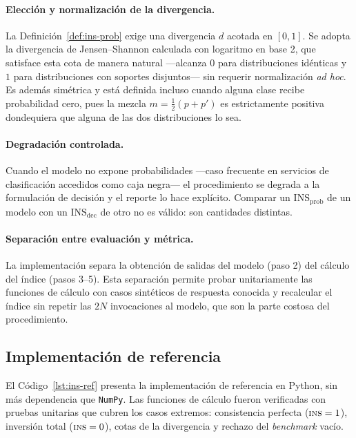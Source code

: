 \paragraph{Elección y normalización de la divergencia.} La
Definición~\ref{def:ins-prob} exige una divergencia $d$ acotada en $[0,1]$.
Se adopta la divergencia de Jensen--Shannon calculada con logaritmo en base 2,
que satisface esta cota de manera natural ---alcanza $0$ para distribuciones
idénticas y $1$ para distribuciones con soportes disjuntos--- sin requerir
normalización \emph{ad hoc}. Es además simétrica y está definida incluso
cuando alguna clase recibe probabilidad cero, pues la mezcla
$m = \tfrac{1}{2}(p + p')$ es estrictamente positiva dondequiera que alguna
de las dos distribuciones lo sea.

\paragraph{Degradación controlada.} Cuando el modelo no expone
probabilidades ---caso frecuente en servicios de clasificación accedidos como
caja negra--- el procedimiento se degrada a la formulación de decisión y el
reporte lo hace explícito. Comparar un $\mathrm{INS}_{\mathrm{prob}}$ de un
modelo con un $\mathrm{INS}_{\mathrm{dec}}$ de otro no es válido: son
cantidades distintas.

\paragraph{Separación entre evaluación y métrica.} La implementación separa
la obtención de salidas del modelo (paso 2) del cálculo del índice (pasos
3--5). Esta separación permite probar unitariamente las funciones de cálculo
con casos sintéticos de respuesta conocida y recalcular el índice sin repetir
las $2N$ invocaciones al modelo, que son la parte costosa del procedimiento.

\subsection{Implementación de referencia}

El Código~\ref{lst:ins-ref} presenta la implementación de referencia en
Python, sin más dependencia que \texttt{NumPy}. Las funciones de cálculo
fueron verificadas con pruebas unitarias que cubren los casos extremos:
consistencia perfecta ($\textsc{ins} = 1$), inversión total ($\textsc{ins} = 0$), cotas de la
divergencia y rechazo del \emph{benchmark} vacío.

